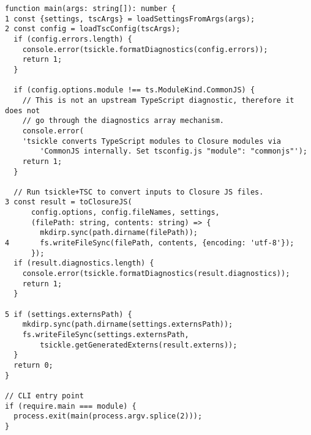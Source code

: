 \begin{verbatim}
function main(args: string[]): number {
1 const {settings, tscArgs} = loadSettingsFromArgs(args);
2 const config = loadTscConfig(tscArgs);
  if (config.errors.length) {
    console.error(tsickle.formatDiagnostics(config.errors));
    return 1;
  }

  if (config.options.module !== ts.ModuleKind.CommonJS) {
    // This is not an upstream TypeScript diagnostic, therefore it does not
    // go through the diagnostics array mechanism.
    console.error(
    'tsickle converts TypeScript modules to Closure modules via
        'CommonJS internally. Set tsconfig.js "module": "commonjs"');
    return 1;
  }

  // Run tsickle+TSC to convert inputs to Closure JS files.
3 const result = toClosureJS(
      config.options, config.fileNames, settings,
      (filePath: string, contents: string) => {
        mkdirp.sync(path.dirname(filePath));
4       fs.writeFileSync(filePath, contents, {encoding: 'utf-8'});
      });
  if (result.diagnostics.length) {
    console.error(tsickle.formatDiagnostics(result.diagnostics));
    return 1;
  }

5 if (settings.externsPath) {
    mkdirp.sync(path.dirname(settings.externsPath));
    fs.writeFileSync(settings.externsPath,
        tsickle.getGeneratedExterns(result.externs));
  }
  return 0;
}

// CLI entry point
if (require.main === module) {
  process.exit(main(process.argv.splice(2)));
}
\end{verbatim}
